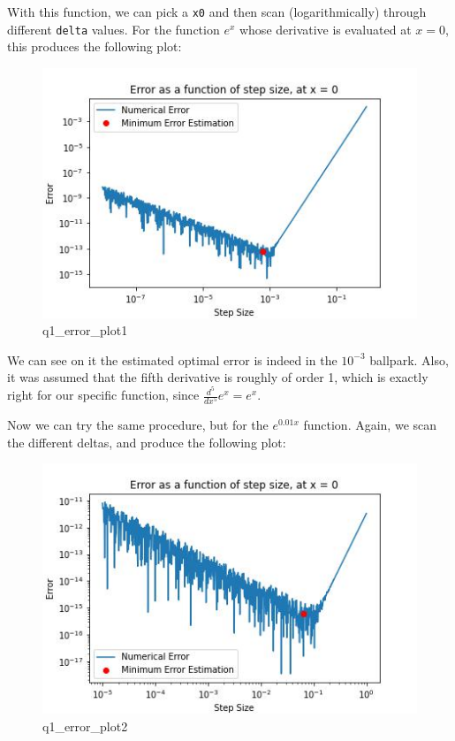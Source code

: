 \documentclass[
]{article}
\begin{document}
With this function, we can pick a \texttt{x0} and then scan
(logarithmically) through different \texttt{delta} values. For the
function \(e^{x}\) whose derivative is evaluated at \(x=0\), this
produces the following plot:

\begin{figure}
\centering
\includegraphics{figs/q1_error_plot1.jpg}
\caption{q1\_error\_plot1}
\end{figure}

We can see on it the estimated optimal error is indeed in the
\(10^{-3}\) ballpark. Also, it was assumed that the fifth derivative is
roughly of order 1, which is exactly right for our specific function,
since \(\frac{d^5}{dx^5} e^x = e^x\).

Now we can try the same procedure, but for the \(e^{0.01 x}\) function.
Again, we scan the different deltas, and produce the following plot:

\begin{figure}
\centering
\includegraphics{figs/q1_error_plot2.jpg}
\caption{q1\_error\_plot2}
\end{figure}
\end{document}
